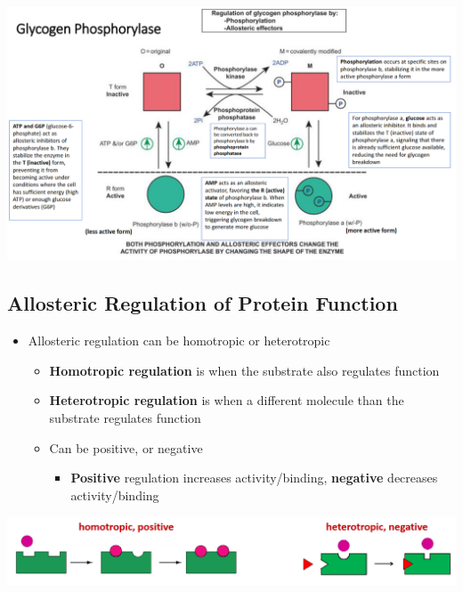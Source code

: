 \documentclass[10pt]{article}
\begin{document}
\begin{center} 
	\includegraphics*[width=\textwidth]{L1_19.png}
\end{center}

\subsection*{Allosteric Regulation of Protein Function}
\begin{itemize}
    \item Allosteric regulation can be homotropic or heterotropic
    \begin{itemize}
        \item \textbf{Homotropic regulation} is when the substrate also regulates function
        \item \textbf{Heterotropic regulation} is when a different molecule than the substrate regulates function
        \item Can be positive, or negative
        \begin{itemize}
            \item \textbf{Positive} regulation increases activity/binding, \textbf{negative} decreases activity/binding
        \end{itemize}
    \end{itemize}
\end{itemize}
\begin{center} 
	\includegraphics*[width=\textwidth]{L1_20.png}
\end{center}
\end{document}

